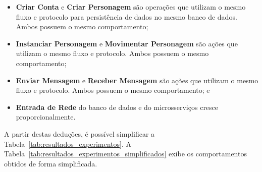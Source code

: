 \begin{itemize}
 \item \textbf{Criar Conta} e \textbf{Criar Personagem} são operações que utilizam o mesmo fluxo e protocolo para persistência de dados no mesmo banco de dados. Ambos possuem o mesmo comportamento;
 \item \textbf{Instanciar Personagem} e \textbf{Movimentar Personagem} são ações que utilizam o mesmo fluxo e protocolo. Ambos possuem o mesmo comportamento;
 \item \textbf{Enviar Mensagem} e \textbf{Receber Mensagem} são ações que utilizam o mesmo fluxo e protocolo. Ambos possuem o mesmo comportamento; e
 \item \textbf{Entrada de Rede} do banco de dados e do microsserviços cresce proporcionalmente.
\end{itemize}

A partir destas deduções, é possível simplificar a Tabela~\ref{tab:resultados_experimentos}.
%
A Tabela~\ref{tab:resultados_experimentos_simplificados} exibe os comportamentos obtidos de forma simplificada.
\pagebreak

